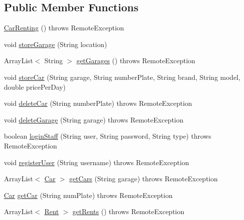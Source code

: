 \subsection*{Public Member Functions}
\begin{DoxyCompactItemize}
\item 
\mbox{\hyperlink{classcarrenting_1_1server_1_1_car_renting_aeb9f1491df8b5dd6b9a9c20a8a255fec}{Car\+Renting}} ()  throws Remote\+Exception 
\item 
void \mbox{\hyperlink{classcarrenting_1_1server_1_1_car_renting_a00e1951eeaff747c8a601d586b3fb8e9}{store\+Garage}} (String location)
\item 
Array\+List$<$ String $>$ \mbox{\hyperlink{classcarrenting_1_1server_1_1_car_renting_a65886cbac0c23f1dd39c1b2bf5daec25}{get\+Garages}} ()  throws Remote\+Exception
\item 
void \mbox{\hyperlink{classcarrenting_1_1server_1_1_car_renting_a4a562c581946a77d814f10ee7c53b3f5}{store\+Car}} (String garage, String number\+Plate, String brand, String model, double price\+Per\+Day)
\item 
void \mbox{\hyperlink{classcarrenting_1_1server_1_1_car_renting_ab4f8e49f619868d8665ddb1fed45e398}{delete\+Car}} (String number\+Plate)  throws Remote\+Exception 
\item 
void \mbox{\hyperlink{classcarrenting_1_1server_1_1_car_renting_ad1b784e2383f3c5ea6de3783fe4306f7}{delete\+Garage}} (String garage)  throws Remote\+Exception
\item 
boolean \mbox{\hyperlink{classcarrenting_1_1server_1_1_car_renting_a99b2a341e48a7270ae5ee51d8ac4414c}{login\+Staff}} (String user, String password, String type)  throws Remote\+Exception
\item 
void \mbox{\hyperlink{classcarrenting_1_1server_1_1_car_renting_ae378b81a5c614b66474e89c26c513cb7}{register\+User}} (String username)  throws Remote\+Exception
\item 
Array\+List$<$ \mbox{\hyperlink{classcarrenting_1_1server_1_1jdo_1_1_car}{Car}} $>$ \mbox{\hyperlink{classcarrenting_1_1server_1_1_car_renting_a11dd014dde29a6d25450e6269ddb78c7}{get\+Cars}} (String garage)  throws Remote\+Exception 
\item 
\mbox{\hyperlink{classcarrenting_1_1server_1_1jdo_1_1_car}{Car}} \mbox{\hyperlink{classcarrenting_1_1server_1_1_car_renting_a7f49dd67da8352a564161f9a164523cf}{get\+Car}} (String num\+Plate)  throws Remote\+Exception
\item 
Array\+List$<$ \mbox{\hyperlink{classcarrenting_1_1server_1_1jdo_1_1_rent}{Rent}} $>$ \mbox{\hyperlink{classcarrenting_1_1server_1_1_car_renting_aa888e82a1c7d54b10c1e2d8b02b5a363}{get\+Rents}} ()  throws Remote\+Exception 
\end{DoxyCompactItemize}
